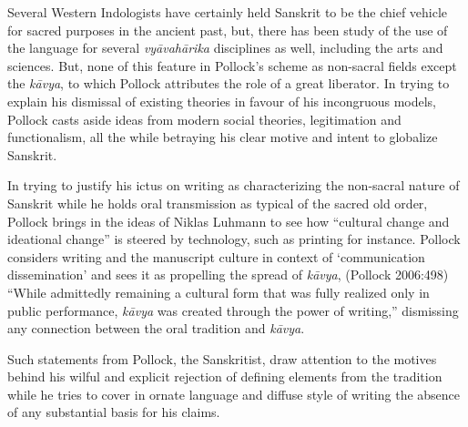 Several Western Indologists have certainly held Sanskrit to be the chief vehicle for sacred purposes in the ancient past, but, there has been study of the use of the language for several \textit{vyāvahārika} disciplines as well, including the arts and sciences. But, none of this feature in Pollock’s scheme as non-sacral fields except the \textit{kāvya}, to which Pollock attributes the role of a great liberator. In trying to explain his dismissal of existing theories in favour of his incongruous models, Pollock casts aside ideas from modern social theories, legitimation and functionalism, all the while betraying his clear motive and intent to globalize Sanskrit.

In trying to justify his ictus on writing as characterizing the non-sacral nature of Sanskrit while he holds oral transmission as typical of the sacred old order, Pollock brings in the ideas of Niklas Luhmann to see how “cultural change and ideational change” is steered by technology, such as printing for instance. Pollock considers writing and the manuscript culture in context of ‘communication dissemination’ and sees it as propelling the spread of \textit{kāvya}, (Pollock 2006:498) “While admittedly remaining a cultural form that was fully realized only in public performance, \textit{kāvya} was created through the power of writing,” dismissing any connection between the oral tradition and \textit{kāvya}.

Such statements from Pollock, the Sanskritist, draw attention to the motives behind his wilful and explicit rejection of defining elements from the tradition while he tries to cover in ornate language and diffuse style of writing the absence of any substantial basis for his claims.

